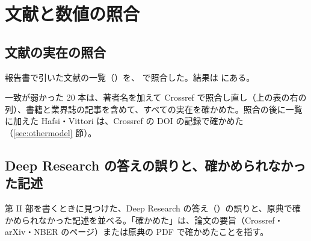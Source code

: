 \chapter{文献と数値の照合}
\label{ch:verify}

\section{文献の実在の照合}

報告書で引いた文献の一覧（）を、 で照合した。結果は  にある。



一致が弱かった 20 本は、著者名を加えて Crossref で照合し直し（上の表の右の列）、書籍と業界誌の記事を含めて、すべての実在を確かめた。照合の後に一覧に加えた Hafsi・Vittori は、Crossref の DOI の記録で確かめた（\ref{sec:othermodel} 節）。

\section{Deep Research の答えの誤りと、確かめられなかった記述}

第 II 部を書くときに見つけた、Deep Research の答え（）の誤りと、原典で確かめられなかった記述を並べる。「確かめた」は、論文の要旨（Crossref・arXiv・NBER のページ）または原典の PDF で確かめたことを指す。

